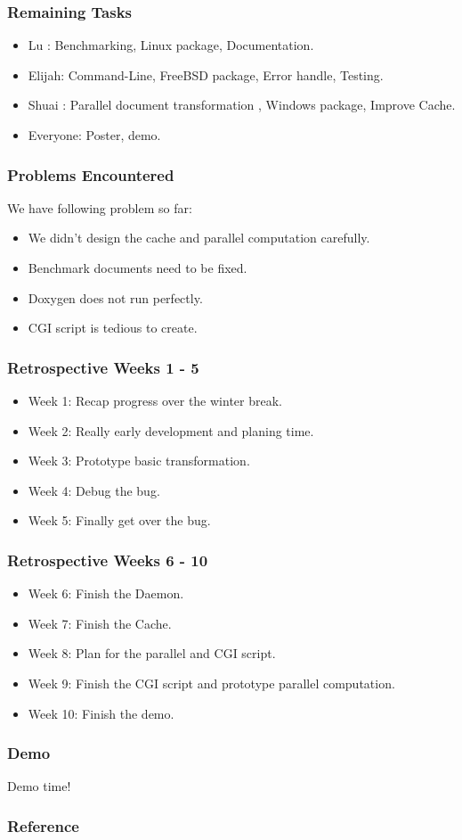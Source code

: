 \documentclass{beamer}
\begin{document}
\begin{frame}
  \frametitle{Remaining Tasks}
  \begin{itemize}
    \item Lu    : Benchmarking, Linux package, Documentation.
    \item Elijah: Command-Line, FreeBSD package, Error handle, Testing.
    \item Shuai : Parallel document transformation , Windows package, Improve Cache.
    \item Everyone: Poster, demo.
  \end{itemize}
\end{frame}

\begin{frame}
  \frametitle{Problems Encountered}
  We have following problem so far:
  \begin{itemize}
    \item We didn't design the cache and parallel computation carefully.
    \item Benchmark documents need to be fixed.
    \item Doxygen does not run perfectly. 
    \item CGI script is tedious to create.
  \end{itemize}
\end{frame}

\begin{frame}
	\frametitle{Retrospective Weeks 1 - 5}
	\begin{itemize}
		\item Week 1: Recap progress over the winter break.
		\item Week 2: Really early development and planing time.
		\item Week 3: Prototype basic transformation.
		\item Week 4: Debug the bug.
		\item Week 5: Finally get over the bug.
	\end{itemize}
\end{frame}

\begin{frame}
	\frametitle{Retrospective Weeks 6 - 10}
	\begin{itemize}
		\item Week 6: Finish the Daemon. 
		\item Week 7: Finish the Cache.
		\item Week 8: Plan for the parallel and CGI script.
		\item Week 9: Finish the CGI script and prototype parallel computation.
		\item Week 10: Finish the demo.
	\end{itemize}
\end{frame}



\begin{frame}
  \frametitle{Demo}
  Demo time!
\end{frame}

\begin{frame}
  \frametitle{Reference}
    \printbibliography
\end{frame}
\end{document}
